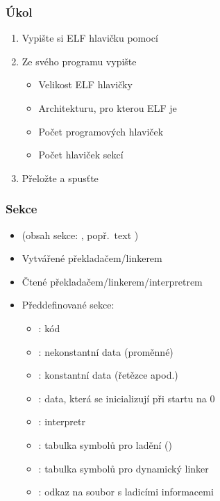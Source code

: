 \begin{frame}
  \frametitle{Úkol}

  \begin{enumerate}
    \item Vypište si ELF hlavičku pomocí 
    \item Ze svého programu vypište
    \begin{itemize}
      \item Velikost ELF hlavičky
      \item Architekturu, pro kterou ELF je
      \item Počet programových hlaviček
      \item Počet hlaviček sekcí
    \end{itemize}

    \item Přeložte a spusťte
  \end{enumerate}

\end{frame}

\begin{frame}
  \frametitle{Sekce}

  \begin{itemize}
    \item {} (obsah sekce: ,
      popř.\ text )

    \pause

    \item Vytvářené překladačem/linkerem
    \item Čtené překladačem/linkerem/interpretrem

    \pause

    \item Předdefinované sekce:
    \begin{itemize}
      \item {}: kód
      \item {}: nekonstantní data (proměnné)
      \item {}: konstantní data (řetězce apod.)
      \item {}: data, která se inicializují při startu na 0
      \item {}: interpretr
      \item {}: tabulka symbolů pro ladění ()
      \item {}: tabulka symbolů pro dynamický linker
      \item {}: odkaz na soubor s ladicími informacemi
    \end{itemize}
  \end{itemize}

\end{frame}

